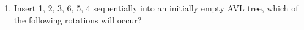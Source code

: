 \documentclass[11pt]{exam}
\begin{document}
\begin{enumerate}
\begin{figure}[H]
 \end{figure}
 \begin{figure}[H]
     \centering
     \hspace{0.5in} 
 \end{figure}
\begin{solution}
    
\end{solution}
\item Insert 1, 2, 3, 6, 5, 4 sequentially into an initially empty AVL tree, which of the following rotations will occur?
\begin{solution}
    

\end{solution}
\end{enumerate}
\end{document}
